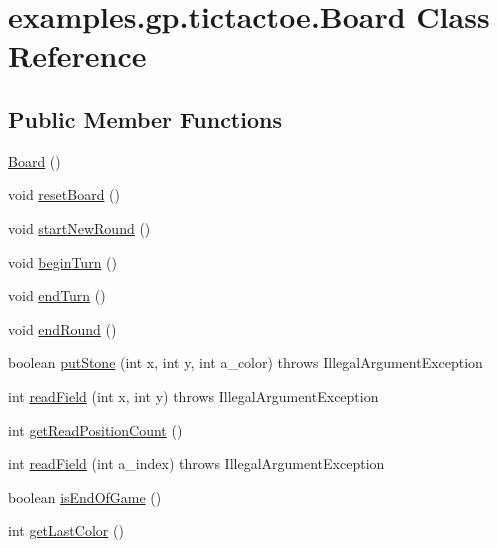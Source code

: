 \hypertarget{classexamples_1_1gp_1_1tictactoe_1_1_board}{\section{examples.\-gp.\-tictactoe.\-Board Class Reference}
\label{classexamples_1_1gp_1_1tictactoe_1_1_board}
}
\subsection*{Public Member Functions}
\begin{DoxyCompactItemize}
\item 
\hyperlink{classexamples_1_1gp_1_1tictactoe_1_1_board_af7a6c3241d7cdbcbe469780f5b4efa3f}{Board} ()
\item 
void \hyperlink{classexamples_1_1gp_1_1tictactoe_1_1_board_a6a7211faba911ea008efee47cf1a0c15}{reset\-Board} ()
\item 
void \hyperlink{classexamples_1_1gp_1_1tictactoe_1_1_board_ac46c9ae108fe371ca04658a70da9787d}{start\-New\-Round} ()
\item 
void \hyperlink{classexamples_1_1gp_1_1tictactoe_1_1_board_abeffe3405b61e784325328bca0966537}{begin\-Turn} ()
\item 
void \hyperlink{classexamples_1_1gp_1_1tictactoe_1_1_board_a232f0325b5ef3fe5f8fd2ceeb832e9a3}{end\-Turn} ()
\item 
void \hyperlink{classexamples_1_1gp_1_1tictactoe_1_1_board_a79fdca483b7510757c09556c74cf1a71}{end\-Round} ()
\item 
boolean \hyperlink{classexamples_1_1gp_1_1tictactoe_1_1_board_a68ff8972942d75e84e0f1d6aed92099f}{put\-Stone} (int x, int y, int a\-\_\-color)  throws Illegal\-Argument\-Exception 
\item 
int \hyperlink{classexamples_1_1gp_1_1tictactoe_1_1_board_a0eb055a2660809449417c167699e44d7}{read\-Field} (int x, int y)  throws Illegal\-Argument\-Exception 
\item 
int \hyperlink{classexamples_1_1gp_1_1tictactoe_1_1_board_aebf2a859e86f2640b8e372f8fe050ab7}{get\-Read\-Position\-Count} ()
\item 
int \hyperlink{classexamples_1_1gp_1_1tictactoe_1_1_board_adb145c8f1efde7c97895ce125a52f0ce}{read\-Field} (int a\-\_\-index)  throws Illegal\-Argument\-Exception 
\item 
boolean \hyperlink{classexamples_1_1gp_1_1tictactoe_1_1_board_ac0d47f11096b45b444232bb152469c46}{is\-End\-Of\-Game} ()
\item 
int \hyperlink{classexamples_1_1gp_1_1tictactoe_1_1_board_a7c558f63181ef10aaaeb69186799c182}{get\-Last\-Color} ()
\end{DoxyCompactItemize}
